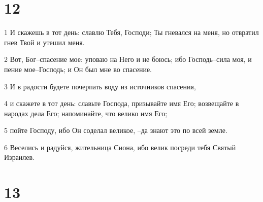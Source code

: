 \chapter{12}

\par 1 И скажешь в тот день: славлю Тебя, Господи; Ты гневался на меня, но отвратил гнев Твой и утешил меня.
\par 2 Вот, Бог--спасение мое: уповаю на Него и не боюсь; ибо Господь--сила моя, и пение мое--Господь; и Он был мне во спасение.
\par 3 И в радости будете почерпать воду из источников спасения,
\par 4 и скажете в тот день: славьте Господа, призывайте имя Его; возвещайте в народах дела Его; напоминайте, что велико имя Его;
\par 5 пойте Господу, ибо Он соделал великое, --да знают это по всей земле.
\par 6 Веселись и радуйся, жительница Сиона, ибо велик посреди тебя Святый Израилев.

\chapter{13}

